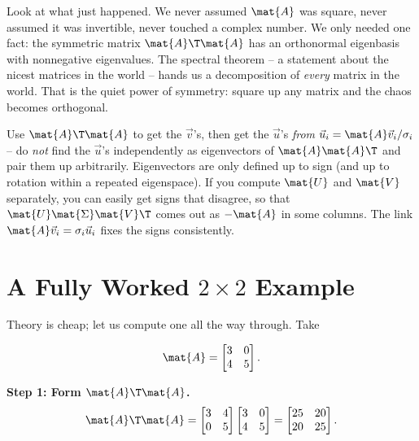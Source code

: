 \begin{aestheticbox}
Look at what just happened. We never assumed $\mat{A}$ was square, never assumed
it was invertible, never touched a complex number. We only needed one fact: the
symmetric matrix $\mat{A}\T\mat{A}$ has an orthonormal eigenbasis with
nonnegative eigenvalues. The spectral theorem -- a statement about the nicest
matrices in the world -- hands us a decomposition of \emph{every} matrix in the
world. That is the quiet power of symmetry: square up any matrix and the chaos
becomes orthogonal.
\end{aestheticbox}

\begin{trapbox}
Use $\mat{A}\T\mat{A}$ to get the $\vec{v}$'s, then get the $\vec{u}$'s
\emph{from} $\vec{u}_i = \mat{A}\vec{v}_i / \sigma_i$ -- do \emph{not} find the
$\vec{u}$'s independently as eigenvectors of $\mat{A}\mat{A}\T$ and pair them up
arbitrarily. Eigenvectors are only defined up to sign (and up to rotation within
a repeated eigenspace). If you compute $\mat{U}$ and $\mat{V}$ separately, you
can easily get signs that disagree, so that $\mat{U}\mat{\Sigma}\mat{V}\T$ comes
out as $-\mat{A}$ in some columns. The link $\mat{A}\vec{v}_i = \sigma_i\vec{u}_i$
fixes the signs consistently.
\end{trapbox}

\section{A Fully Worked $2 \times 2$ Example}
\label{ch29:worked-2x2}

Theory is cheap; let us compute one all the way through. Take

\[
  \mat{A} = \begin{bmatrix} 3 & 0 \\ 4 & 5 \end{bmatrix}.
\]

\textbf{Step 1: Form $\mat{A}\T\mat{A}$.}
\[
  \mat{A}\T\mat{A}
  = \begin{bmatrix} 3 & 4 \\ 0 & 5 \end{bmatrix}
    \begin{bmatrix} 3 & 0 \\ 4 & 5 \end{bmatrix}
  = \begin{bmatrix} 25 & 20 \\ 20 & 25 \end{bmatrix}.
\]

